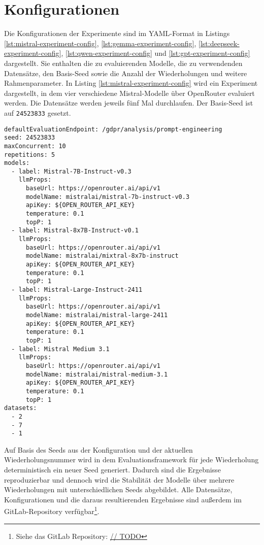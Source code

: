 \section{Konfigurationen}\label{sec:konfigurationen}

Die Konfigurationen der Experimente sind im YAML-Format in Listings \ref{lst:mistral-experiment-config}, \ref{lst:gemma-experiment-config}, \ref{lst:deepseek-experiment-config}, \ref{lst:qwen-experiment-config} und \ref{lst:gpt-experiment-config} dargestellt. Sie enthalten die zu evaluierenden Modelle, die zu verwendenden Datensätze, den Basis-Seed sowie die Anzahl der Wiederholungen und weitere Rahmenparameter. In Listing \ref{lst:mistral-experiment-config} wird ein Experiment dargestellt, in dem vier verschiedene Mistral-Modelle über OpenRouter evaluiert werden. Die Datensätze werden jeweils fünf Mal durchlaufen. Der Basis-Seed ist auf \texttt{24523833} gesetzt.

\begin{lstlisting}[float, caption={Konfigurationsdatei des Experiments mit Mistral Modellen}, label={lst:mistral-experiment-config}]
defaultEvaluationEndpoint: /gdpr/analysis/prompt-engineering
seed: 24523833
maxConcurrent: 10
repetitions: 5
models:
  - label: Mistral-7B-Instruct-v0.3
    llmProps:
      baseUrl: https://openrouter.ai/api/v1
      modelName: mistralai/mistral-7b-instruct-v0.3
      apiKey: ${OPEN_ROUTER_API_KEY}
      temperature: 0.1
      topP: 1
  - label: Mistral-8x7B-Instruct-v0.1
    llmProps:
      baseUrl: https://openrouter.ai/api/v1
      modelName: mistralai/mixtral-8x7b-instruct
      apiKey: ${OPEN_ROUTER_API_KEY}
      temperature: 0.1
      topP: 1
  - label: Mistral-Large-Instruct-2411
    llmProps:
      baseUrl: https://openrouter.ai/api/v1
      modelName: mistralai/mistral-large-2411
      apiKey: ${OPEN_ROUTER_API_KEY}
      temperature: 0.1
      topP: 1
  - label: Mistral Medium 3.1
    llmProps:
      baseUrl: https://openrouter.ai/api/v1
      modelName: mistralai/mistral-medium-3.1
      apiKey: ${OPEN_ROUTER_API_KEY}
      temperature: 0.1
      topP: 1
datasets:
  - 2
  - 7
  - 1
\end{lstlisting}

Auf Basis des Seeds aus der Konfiguration und der aktuellen Wiederholungsnummer wird in dem Evaluationsframework für jede Wiederholung deterministisch ein neuer Seed generiert. Dadurch sind die Ergebnisse reproduzierbar und dennoch wird die Stabilität der Modelle über mehrere Wiederholungen mit unterschiedlichen Seeds abgebildet. Alle Datensätze, Konfigurationen und die daraus resultierenden Ergebnisse sind außerdem im GitLab‑Repository verfügbar\footnote{Siehe das GitLab Repository: \hyperlink{// TODO}{// TODO}}.

